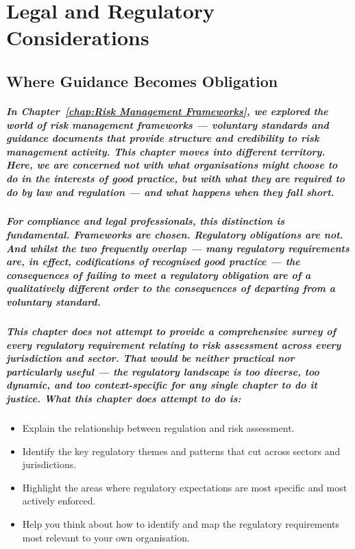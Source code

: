 \chapter{Legal and Regulatory Considerations}
\label{chap:Legal and Regulatory Considerations}

\section{Where Guidance Becomes Obligation}
\paragraph{In Chapter~\ref{chap:Risk Management Frameworks}, we explored the world of risk management frameworks — voluntary standards and guidance documents that provide structure and credibility to risk management activity. This chapter moves into different territory. Here, we are concerned not with what organisations \textit{might} choose to do in the interests of good practice, but with what they \textit{are required} to do by law and regulation — and what happens when they fall short.}
\paragraph{For compliance and legal professionals, this distinction is fundamental. Frameworks are chosen. Regulatory obligations are not. And whilst the two frequently overlap — many regulatory requirements are, in effect, codifications of recognised good practice — the consequences of failing to meet a regulatory obligation are of a qualitatively different order to the consequences of departing from a voluntary standard.}
\paragraph{This chapter does not attempt to provide a comprehensive survey of every regulatory requirement relating to risk assessment across every jurisdiction and sector. That would be neither practical nor particularly useful — the regulatory landscape is too diverse, too dynamic, and too context-specific for any single chapter to do it justice. What this chapter \textit{does} attempt to do is:}
\begin{itemize}
    \item{Explain the relationship between regulation and risk assessment.}
    \item{Identify the key regulatory themes and patterns that cut across sectors and jurisdictions.}
    \item{Highlight the areas where regulatory expectations are most specific and most actively enforced.}
    \item{Help you think about how to identify and map the regulatory requirements most relevant to your own organisation.}
\end{itemize}
